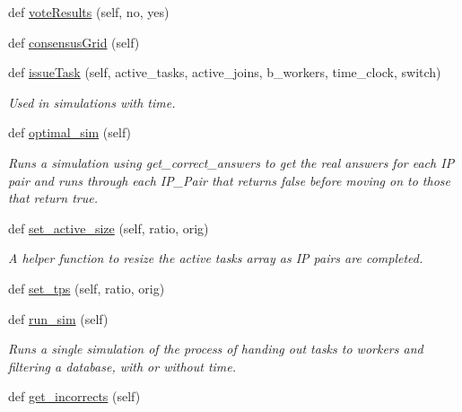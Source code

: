 \begin{DoxyCompactItemize}
def \hyperlink{classdynamicfilterapp_1_1test__simulations_1_1_simulation_test_a042330aaf0a341a79e80194c2637c1ef}{vote\+Results} (self, no, yes)
\item 
def \hyperlink{classdynamicfilterapp_1_1test__simulations_1_1_simulation_test_ace5df674cddd1b8f77748b585a69feb9}{consensus\+Grid} (self)
\item 
def \hyperlink{classdynamicfilterapp_1_1test__simulations_1_1_simulation_test_a1053a9c96fb2665adc869c558b818a47}{issue\+Task} (self, active\+\_\+tasks, active\+\_\+joins, b\+\_\+workers, time\+\_\+clock, switch)
\begin{DoxyCompactList}\small\item\em Used in simulations with time. \end{DoxyCompactList}\item 
def \hyperlink{classdynamicfilterapp_1_1test__simulations_1_1_simulation_test_a3485447162eb85b9d98dd4ebd84c6e50}{optimal\+\_\+sim} (self)
\begin{DoxyCompactList}\small\item\em Runs a simulation using get\+\_\+correct\+\_\+answers to get the real answers for each IP pair and runs through each I\+P\+\_\+\+Pair that returns false before moving on to those that return true. \end{DoxyCompactList}\item 
def \hyperlink{classdynamicfilterapp_1_1test__simulations_1_1_simulation_test_a966a3c31662ba0c8c2d3d095899ec1ad}{set\+\_\+active\+\_\+size} (self, ratio, orig)
\begin{DoxyCompactList}\small\item\em A helper function to resize the active tasks array as IP pairs are completed. \end{DoxyCompactList}\item 
def \hyperlink{classdynamicfilterapp_1_1test__simulations_1_1_simulation_test_aad2d8e9dd7aa97a8929ef0f348af5f52}{set\+\_\+tps} (self, ratio, orig)
\item 
def \hyperlink{classdynamicfilterapp_1_1test__simulations_1_1_simulation_test_aafbc405f49645141a30302a448b056dc}{run\+\_\+sim} (self)
\begin{DoxyCompactList}\small\item\em Runs a single simulation of the process of handing out tasks to workers and filtering a database, with or without time. \end{DoxyCompactList}\item 
def \hyperlink{classdynamicfilterapp_1_1test__simulations_1_1_simulation_test_a9adfa8688f12473b0c394cd3b7237be0}{get\+\_\+incorrects} (self)

\end{DoxyCompactItemize}
